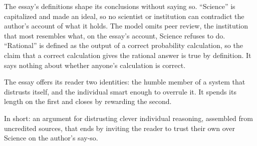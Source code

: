 \begin{afterword}
The essay's definitions shape its conclusions without saying so. ``Science'' is capitalized and made an ideal, so no scientist or institution can contradict the author's account of what it holds. The model omits peer review, the institution that most resembles what, on the essay's account, Science refuses to do. ``Rational'' is defined as the output of a correct probability calculation, so the claim that a correct calculation gives the rational answer is true by definition. It says nothing about whether anyone's calculation is correct.

The essay offers its reader two identities: the humble member of a system that distrusts itself, and the individual smart enough to overrule it. It spends its length on the first and closes by rewarding the second.

In short: an argument for distrusting clever individual reasoning, assembled from uncredited sources, that ends by inviting the reader to trust their own over Science on the author's say-so.
\end{afterword}
